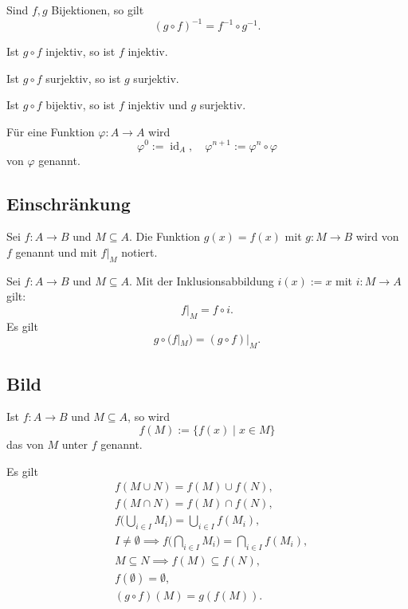 Sind $f,g$ Bijektionen, so gilt
\begin{equation}
(g\circ f)^{-1} = f^{-1}\circ g^{-1}.
\end{equation}

Ist $g\circ f$ injektiv, so ist $f$ injektiv.

Ist $g\circ f$ surjektiv, so ist $g$ surjektiv.

Ist $g\circ f$ bijektiv, so ist $f$ injektiv und $g$ surjektiv.

\begin{Definition}
Für eine Funktion $\varphi\colon A\to A$ wird
\begin{equation}
\varphi^0:=\operatorname{id}_A,\quad \varphi^{n+1}:=\varphi^n\circ\varphi
\end{equation}
 von $\varphi$ genannt.
\end{Definition}

\subsection{Einschränkung}
\begin{Definition} Sei $f\colon A\to B$ und $M\subseteq A$.
Die Funktion $g(x)=f(x)$ mit $g\colon M\to B$ wird 
von $f$ genannt und mit $f|_M$ notiert.
\end{Definition}
Sei $f\colon A\to B$ und $M\subseteq A$.
Mit der Inklusionsabbildung $i(x):=x$ mit $i\colon M\to A$ gilt:
\begin{equation}
f|_M = f\circ i.
\end{equation}
Es gilt
\begin{equation}
g\circ (f|_M) = (g\circ f)|_M.
\end{equation}
\newpage
\subsection{Bild}
\begin{Definition} Ist $f\colon A\to B$ und $M\subseteq A$, so wird
\begin{equation}
f(M) := \{f(x)\mid x\in M\}
\end{equation}
das  von $M$ unter $f$ genannt.
\end{Definition}
Es gilt
\begin{align}
&f(M\cup N) = f(M)\cup f(N),\\
&f(M\cap N) = f(M)\cap f(N),\\
&f\Big(\bigcup_{i\in I}M_i\Big) = \bigcup_{i\in I} f(M_i),\\
&I\ne\emptyset\implies f\Big(\bigcap_{i\in I} M_i\Big) = \bigcap_{i\in I} f(M_i),\\
&M\subseteq N\implies f(M)\subseteq f(N),\\
&f(\emptyset) = \emptyset,\\
&(g\circ f)(M) = g(f(M)).
\end{align}

